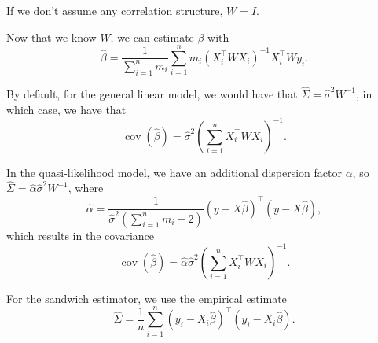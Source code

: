 \documentclass[11pt, letterpaper]{article}
\begin{document}
\begin{description}
  If we don't assume any correlation structure, $W = I$.

  Now that we know $W$, we can estimate $\beta$ with
  \begin{equation}
    \hat{\beta} = \frac{1}{\sum_{i=1}^nm_i}\sum_{i=1}^nm_i\left(X_i^\intercal W X_i\right)^{-1} X_i^\intercal W y_i.
  \end{equation}
  
  By default, for the general linear model, we would have that
  $\hat{\Sigma} = \hat{\sigma}^2 W^{-1}$, in which case, we have that
  \begin{equation}
    \operatorname{cov}\left(\hat{\beta}\right)
    = \hat{\sigma}^2 \left(\sum_{i=1}^n X_i^\intercal W X_i\right)^{-1}.
  \end{equation}

  In the quasi-likelihood model, we have an additional dispersion factor
  $\alpha$, so $\hat{\Sigma} = \hat{\alpha}\hat{\sigma}^2 W^{-1}$, where
  \begin{equation}
    \hat{\alpha} = \frac{1}{\hat{\sigma}^2\left(\sum_{i=1}^n m_i - 2\right)}
    \left(y - X\hat{\beta}\right)^\intercal\left(y - X\hat{\beta}\right),
  \end{equation}
  which results in the covariance
  \begin{equation}
    \operatorname{cov}\left(\hat{\beta}\right)
    = \hat{\alpha}\hat{\sigma}^2 \left(\sum_{i=1}^n X_i^\intercal W X_i\right)^{-1}.
  \end{equation}

  For the sandwich estimator, we use the empirical estimate
  \begin{equation}
    \hat{\Sigma} = \frac{1}{n}\sum_{i=1}^n
    \left(y_i - X_i\hat{\beta}\right)^\intercal \left(y_i - X_i\hat{\beta}\right).
  \end{equation}
  
\end{description}
\end{document}
